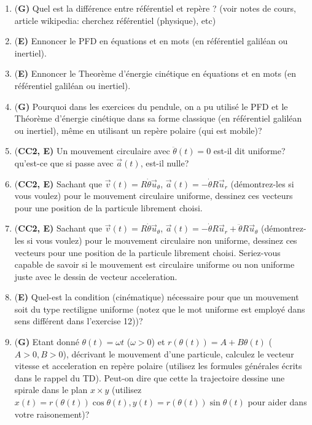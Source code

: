 \documentclass[french,12pt]{article}
\begin{document}
\begin{enumerate}
\item {(\bf G)} Quel est la différence entre référentiel et repère ? (voir notes de cours, article wikipedia: cherchez référentiel (physique), etc)
\item {(\bf E)} Ennoncer le PFD en équations et en mots (en référentiel galiléan ou inertiel). 
\item {(\bf E)} Ennoncer le Theorème d'énergie cinétique en équations et en mots (en référentiel galiléan ou inertiel).
\item {(\bf G)} Pourquoi dans les exercices du pendule, on a pu utilisé le PFD et le Théorème d'énergie cinétique dans sa forme classique (en référentiel galiléan ou inertiel), même en utilisant un repère polaire (qui est mobile)?  
\item {(\bf CC2, E)} Un mouvement circulaire avec $\ddot{\theta}(t) = 0$ est-il dit uniforme? qu'est-ce que si passe avec $\Vec{a}(t)$, est-il nulle?
\item {(\bf CC2, E)} Sachant que $\Vec{v}(t) = R\dot{\theta} \Vec{u}_{\theta}$, $\Vec{a}(t) = - \dot{\theta} R \Vec{u}_r$ (démontrez-les si vous voulez) pour le mouvement circulaire uniforme, dessinez ces vecteurs pour une position de la particule librement choisi.
\item {(\bf CC2, E)} Sachant que $\Vec{v}(t) = R\dot{\theta} \Vec{u}_{\theta}$, $\Vec{a}(t) = - \dot{\theta} R \Vec{u}_r + \ddot{\theta} R \Vec{u}_{\theta}$ (démontrez-les si vous voulez) pour le mouvement circulaire non uniforme, dessinez ces vecteurs pour une position de la particule librement choisi. Seriez-vous capable de savoir si le mouvement est circulaire uniforme ou non uniforme juste avec le dessin de vecteur acceleration. 
\item {(\bf E)} Quel-est la condition (cinématique) nécessaire pour que un mouvement soit du type rectiligne uniforme (notez que le mot uniforme est employé dans sens différent dans l'exercise 12))? 
 
\item {(\bf G)} Etant donné $\theta(t) = \omega t$ ($\omega >0$) et $r(\theta(t)) = A + B \theta(t)$ ($A>0, B>0$), décrivant le mouvement d'une particule, calculez le vecteur vitesse et acceleration en repère polaire (utilisez les formules générales écrits dans le rappel du TD). Peut-on dire que cette la trajectoire dessine une spirale dans le plan $x \times y$ (utilisez $x(t) = r(\theta(t)) \cos \theta(t), y(t) =  r(\theta(t)) \sin \theta(t)$ pour aider dans votre raisonement)? 



\end{enumerate}
\end{document}
